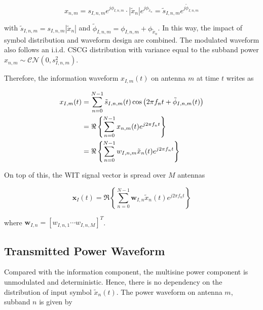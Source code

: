 \begin{equation}\label{eqn:modulated_symbol_further}
  {x_{n,m}} = {s_{I,n,m}}{e^{j{\phi _{I,n,m}}}} \cdot \left| {{{\tilde x}_n}} \right|{e^{j{\phi _{{{\tilde x}_n}}}}} = {{\tilde s}_{I,n,m}}{e^{j{{\tilde \phi }_{I,n,m}}}}
\end{equation}

with ${{\tilde s}_{I,n,m}} = {s_{I,n,m}}\left| {{{\tilde x}_n}} \right|$ and ${{\tilde \phi }_{I,n,m}} = {\phi _{I,n,m}} + {\phi _{{{\tilde x}_n}}}$. In this way, the impact of symbol distribution and waveform design are combined. The modulated waveform also follows an i.i.d. CSCG distribution with variance equal to the subband power ${x_{n,m}}\sim\mathcal{C}\mathcal{N}\left( {0,s_{I,n,m}^2} \right)$.

Therefore, the information waveform ${x_{I,m}}(t)$ on antenna $m$ at time $t$ writes as

\begin{align}\label{eqn:information_waveform}
  {x_{I,m}}(t) &= \sum\limits_{n = 0}^{N - 1} {{{\tilde s}_{I,n,m}}(t)\cos \left( {2\pi {f_n}t + {{\tilde \phi }_{I,n,m}}(t)} \right)}  \hfill \\
   &= \Re \left\{ {\sum\limits_{n = 0}^{N - 1} {{x_{n,m}}(t){e^{j2\pi {f_n}t}}} } \right\} \hfill \\
   &= \Re \left\{ {\sum\limits_{n = 0}^{N - 1} {{w_{I,n,m}}{{\tilde x}_n}(t){e^{j2\pi {f_n}t}}} } \right\} \hfill
\end{align}

On top of this, the WIT signal vector is spread over $M$ antennas

\begin{equation}\label{eqn:wit_vector}
  {{\mathbf{x}}_I}(t) = \Re \left\{ {\sum\limits_{n = 0}^{N - 1} {{{\mathbf{w}}_{I,n}}} {{\tilde x}_n}(t){e^{j2\pi {f_n}t}}} \right\}
\end{equation}

where ${{\mathbf{w}}_{I,n}} = {\left[ {{w_{I,n,1}} \cdots {w_{I,n,M}}} \right]^T}$.



\subsection{Transmitted Power Waveform}\label{sec:transmitted-power-waveform}
Compared with the information component, the multisine power component is unmodulated and deterministic. Hence, there is no dependency on the distribution of input symbol $\tilde{x}_{n}(t)$. The power waveform on antenna $m$, subband $n$ is given by


